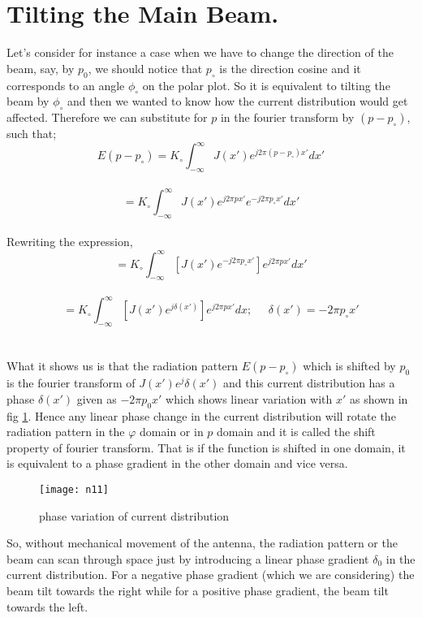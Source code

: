 \section{Tilting the Main Beam.}
Let's consider for instance a case when we have to change the direction of the beam, say, by $p_0$, we should notice that $p_\circ$ is the direction cosine and it corresponds to an angle $\phi_\circ$ on the polar plot. So it is equivalent to tilting the beam by $\phi_\circ$ and then we wanted to know how the current distribution would get affected. Therefore we can substitute for $p$ in the fourier transform by $(p - p_\circ)$, such that;
$$E(p - p_\circ) = K_\circ\int_{-\infty}^{\infty} J(x') e^{j2\pi (p - p_\circ)x'} dx'$$\\
$$= K_\circ\int_{-\infty}^{\infty} J(x') e^{j2\pi px'}  e^{-j2\pi p_\circ x'} dx'$$\\
Rewriting the expression,\\
$$= K_\circ\int_{-\infty}^{\infty} [J(x') e^{-j2\pi p_\circ x'}] e^{j2\pi px'} dx'$$\\
$$ = K_\circ\int_{-\infty}^{\infty} [J(x') e^{j\delta (x')}] e^{j2\pi px'} dx ;\; \; \; \; \; \delta(x') = -2\pi p_\circ x'$$
\\
\\
What it shows us is that the radiation pattern $E(p - p_\circ)$ which is shifted by $p_0$ is the fourier transform of  $J(x')e^j\delta(x')$ and this current distribution has a phase $\delta(x')$ given as $-2\pi p_0x'$ which shows linear variation with $x'$ as shown in fig \ref{fig11}. Hence any linear phase change in the current distribution will rotate the radiation pattern in the $\varphi$ domain or in $p$ domain and it is called the shift property of fourier transform. That is if the function is shifted in one domain, it is equivalent to a phase gradient in the other domain and vice versa.
\begin{figure}[h]
	\centering
	\texttt{[image: n11]}
	\caption{phase variation of current distribution}
	\label{fig11}
\end{figure}

So, without mechanical movement of the antenna, the radiation pattern or the beam can scan through space just by introducing a linear phase gradient $\delta_0$ in the current distribution. For a negative phase gradient (which we are considering) the beam tilt towards the right while for a positive phase gradient, the beam tilt towards the left.\\

